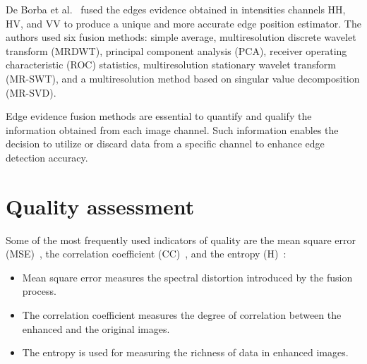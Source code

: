 \documentclass{article}
\begin{document}
De Borba et al.~\cite{DeBorba2020} fused the edges evidence obtained in intensities channels HH, HV, and VV to produce a unique and more accurate edge position estimator. 
The authors used six fusion methods: simple average, multiresolution discrete wavelet transform (MRDWT), principal component analysis (PCA), receiver operating characteristic (ROC) statistics, multiresolution stationary wavelet transform (MR-SWT), and a multiresolution method based on singular value decomposition (MR-SVD).

Edge evidence fusion methods are essential to quantify and qualify the information obtained from each image channel. 
Such information enables the decision to utilize or discard data from a specific channel to enhance edge detection accuracy.

\vspace{-0.2cm}
\section{Quality assessment}
\vspace{-0.2cm}
Some of the most frequently used indicators of quality are the mean square error (MSE)~\cite{beaulieu2003multi}, 
the correlation coefficient (CC)~\cite{aiazzi2004spectral}, and the entropy (H)~\cite{han2008study}:
\begin{itemize}
\itemsep0em 
 \vspace{-0.1cm}\item Mean square error measures the spectral distortion introduced by the fusion process.
\vspace{-0.2cm}\item The correlation coefficient measures the degree of correlation between the enhanced and the original images.\vspace{-0.35cm}
\vspace{-0.2cm}\item The entropy is used for measuring the richness of data in enhanced images.
\end{itemize}
\end{document}
